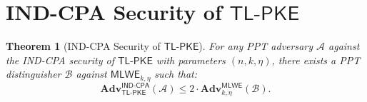 \documentclass[11pt,a4paper]{article}
\newtheorem{theorem}{Theorem}[section]
\theoremstyle{definition}
\newcommand{\Adv}{\mathbf{Adv}}
\newcommand{\MLWE}{\textsf{MLWE}}
\newcommand{\INDCPA}{\textsf{IND-CPA}}
\newcommand{\CPAPKE}{\textsf{TL-PKE}}
\begin{document}
\section{IND-CPA Security of $\CPAPKE$}
\label{sec:cpa-proof}

\begin{theorem}[IND-CPA Security of $\CPAPKE$]
\label{thm:cpa}
For any PPT adversary $\mathcal{A}$ against the IND-CPA security of $\CPAPKE$ with parameters $(n, k, \eta)$, there exists a PPT distinguisher $\mathcal{B}$ against $\MLWE_{k,\eta}$ such that:
\[
  \Adv^{\INDCPA}_{\CPAPKE}(\mathcal{A})
  \leq 2 \cdot \Adv^{\MLWE}_{k,\eta}(\mathcal{B}).
\]
\end{theorem}
\end{document}
